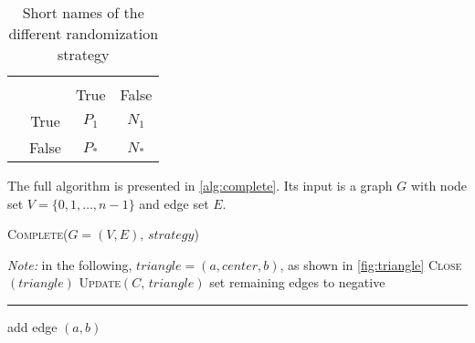 \begin{table}[hptb]
	\centering
	\caption{Short names of the different randomization strategy
		\label{tab:strategy}}
	\begin{tabular}{lccc}
		\toprule
		& & \multicolumn{2}{c}{\pvt{}} \\
		    &          & True & False \\
		\midrule
		\multirow{2}{*}{\oaat{}} & True   & $P_1$ & $N_1$ \\
		& False & $P_*$ & $N_*$ \\
		\bottomrule
	\end{tabular}
\end{table}

The full algorithm is presented in \autoref{alg:complete}. Its input is a
graph $G$ with node set $V=\{0, 1,\ldots, n-1\}$ and edge set $E$.

\begin{algorithm}
	\caption{\textsc{Complete}($G=(V,E),\,strategy$) \label{alg:complete}}
	\begin{algorithmic}[0]
		\State \emph{Note:} in the following, $triangle = (a, center, b)$, as
			shown in \autoref{fig:triangle}
		\EndIf
		\EndFor
				\State \textsc{Close}$(triangle)$
			\EndFor
			\State \textsc{Update}$(C,\, triangle)$
			\EndFor
		\EndWhile
		\State set remaining edges to negative
		\vspace*{0.5\baselineskip}
		\begin{center}
			\rule{0.5\textwidth}{.2pt}
		\end{center}
		\vspace*{0.5\baselineskip}

		\State add edge $(a, b)$
		\EndFunction
		\vspace*{\baselineskip}
			\EndFor
				\EndIf
			\EndFor
				\EndIf
			\EndFor
		\EndFunction
	\end{algorithmic}
\end{algorithm}

